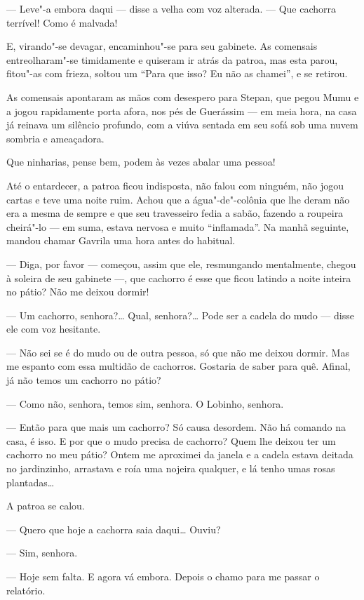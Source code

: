 --- Leve"-a embora daqui --- disse a velha com voz alterada. --- Que
cachorra terrível! Como é malvada!

E, virando"-se devagar, encaminhou"-se para seu gabinete. As comensais
entreolharam"-se timidamente e quiseram ir atrás da patroa, mas esta
parou, fitou"-as com frieza, soltou um ``Para que isso? Eu não as
chamei'', e se retirou.

As comensais apontaram as mãos com desespero para Stepan, que pegou Mumu
e a jogou rapidamente porta afora, nos pés de Guerássim --- em meia
hora, na casa já reinava um silêncio profundo, com a viúva sentada em
seu sofá sob uma nuvem sombria e ameaçadora.

Que ninharias, pense bem, podem às vezes abalar uma pessoa!

Até o entardecer, a patroa ficou indisposta, não falou com ninguém, não
jogou cartas e teve uma noite ruim. Achou que a água"-de"-colônia que lhe
deram não era a mesma de sempre e que seu travesseiro fedia a sabão,
fazendo a roupeira cheirá"-lo --- em suma, estava nervosa e muito
``inflamada''. Na manhã seguinte, mandou chamar Gavrila uma hora antes
do habitual.

--- Diga, por favor --- começou, assim que ele, resmungando mentalmente,
chegou à soleira de seu gabinete ---, que cachorro é esse que ficou
latindo a noite inteira no pátio? Não me deixou dormir!

--- Um cachorro, senhora?\ldots{} Qual, senhora?\ldots{} Pode ser a cadela do mudo
--- disse ele com voz hesitante.

--- Não sei se é do mudo ou de outra pessoa, só que não me deixou
dormir. Mas me espanto com essa multidão de cachorros. Gostaria de saber
para quê. Afinal, já não temos um cachorro no pátio?

--- Como não, senhora, temos sim, senhora. O Lobinho, senhora.

--- Então para que mais um cachorro? Só causa desordem. Não há comando
na casa, é isso. E por que o mudo precisa de cachorro? Quem lhe deixou
ter um cachorro no meu pátio? Ontem me aproximei da janela e a cadela
estava deitada no jardinzinho, arrastava e roía uma nojeira qualquer, e
lá tenho umas rosas plantadas\ldots{}

A patroa se calou.

--- Quero que hoje a cachorra saia daqui\ldots{} Ouviu?

--- Sim, senhora.

--- Hoje sem falta. E agora vá embora. Depois o chamo para me passar o
relatório.

